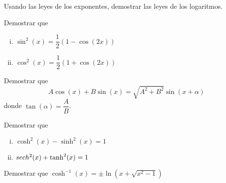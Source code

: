 {}
  \begin{problema}
   \label{solved 1.5}
   Usando las leyes de los exponentes, demostrar las leyes de los logaritmos.
  \end{problema}


{}
  \begin{problema}
   \label{solved 1.6}
   Demostrar que 
   \begin{enumerate}[(i)]
     \item $\sin^{2}(x)=\dfrac{1}{2}\left( 1-\cos(2x) \right)$ 
     
     \item $\cos^{2}(x)=\dfrac{1}{2}\left( 1+\cos(2x) \right)$
\end{enumerate}
  \end{problema}


{}
  \begin{problema}
   \label{solved 1.7}
   Demostrar que \[A \cos(x) + B\sin(x) = \sqrt{A^{2}+B^{2}}\sin(x+\alpha)\] donde $\tan(\alpha)=\dfrac{A}{B}$.
  \end{problema}


{}
  \begin{problema}
   \label{solved 1.8}
   Demostrar que 
   \begin{enumerate}[(i)]
     \item $\cosh^{2}(x)-\sinh^{2}(x)=1$       
     \item $sech^{2}(x)+\tanh^{2}(x)=1$
\end{enumerate}
  \end{problema}


{}
  \begin{problema}
   \label{solved 1.9}
   Demostrar que $\cosh^{-1}(x)=\pm \ln\left( x+\sqrt{x^{2}-1} \right)$
  \end{problema}


